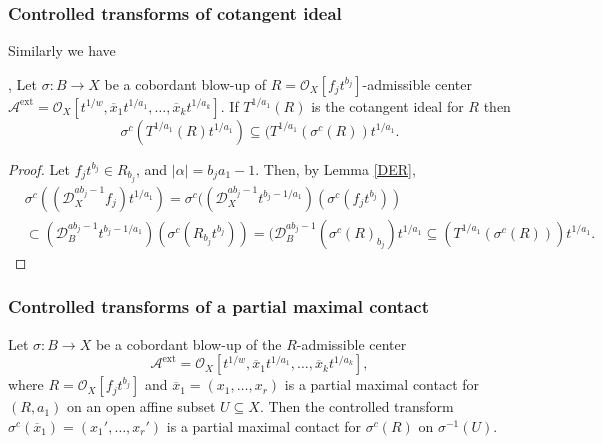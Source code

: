 \documentclass{amsart}
\newcommand{\cA}{{\mathcal A}}
\renewcommand{\cD}{{\mathcal D}}
\newcommand{\cO}{{\mathcal O}}
\newcommand{\ext}{{\operatorname{ext}}}
\begin{document}
\subsubsection{Controlled transforms of cotangent ideal}
Similarly we have 
\begin{lemma}\label{tangent} \cite{ATW-weighted},   Let %
$\sigma: B\to X$ be a cobordant blow-up of $R=\cO_X[f_jt^{b_j}]$-admissible center $\cA^\ext=\cO_X[ t^{1/w},\overline{x}_1t^{1/a_1},\ldots, \overline{x}_kt^{1/a_k}]$. If $T^{1/a_1}(R)$ is the cotangent ideal for $R$ 
then $$\sigma^c(T^{1/a_1}(R)t^{1/a_1})\subseteq (T^{1/a_1}(\sigma^c(R))t^{1/a_1}.$$ \end{lemma}
\begin{proof} Let $f_jt^{b_j}\in R_{b_j}$, and $|\alpha|=b_ja_1-1$. Then, by Lemma \ref{DER}, 
\begin{align*} & \sigma^c((\cD_X^{ab_j-1}f_j)t^{1/a_1})= \sigma^c((\cD_X^{ab_j-1}t^{b_j-1/a_1})(\sigma^c( f_jt^{b_j}))\\
& \subset (\cD_B^{ab_j-1}t^{b_j-1/a_1})(\sigma^c(R_{b_j}t^{b_j}))=(\cD_B^{ab_j-1}(\sigma^c(R)_{b_j})t^{1/a_1}\subseteq  (T^{1/a_1}(\sigma^c(R)))t^{1/a_1}.
\end{align*}
\end{proof}
\subsubsection{Controlled transforms of a partial maximal contact} \label{control2}

\begin{lemma} \label{contact}
Let $\sigma: B \to X$ be a cobordant blow-up of the $R$-admissible center 
\[
\mathcal{A}^\ext = \mathcal{O}_X[t^{1/w}, \overline{x}_1 t^{1/a_1}, \ldots, \overline{x}_k t^{1/a_k}],
\]
where $R = \mathcal{O}_X[f_j t^{b_j}]$ and $\overline{x}_1 = (x_1, \ldots, x_r)$ is a partial maximal contact for $(R, a_1)$ on an open affine subset $U \subseteq X$. Then the controlled transform $\sigma^c(\overline{x}_1) = (x_1', \ldots, x_r')$ is a partial maximal contact for $\sigma^c(R)$ on $\sigma^{-1}(U)$.
\end{lemma}
\end{document}

